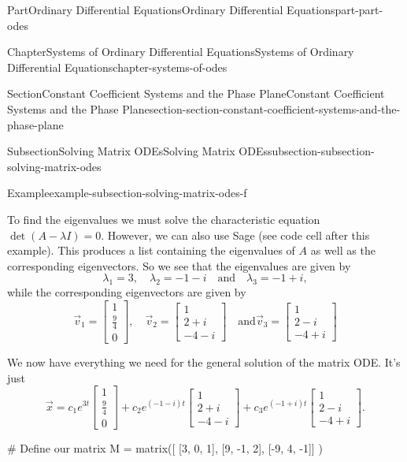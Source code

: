 \documentclass[twoside,10pt,]{book}
\numberwithin{equation}{part}
\begin{document}
\begin{partptx}{Part}{Ordinary Differential Equations}{}{Ordinary Differential Equations}{}{}{part-part-odes}
\begin{chapterptx}{Chapter}{Systems of Ordinary Differential Equations}{}{Systems of Ordinary Differential Equations}{}{}{chapter-systems-of-odes}
\begin{sectionptx}{Section}{Constant Coefficient Systems and the Phase Plane}{}{Constant Coefficient Systems and the Phase Plane}{}{}{section-section-constant-coefficient-systems-and-the-phase-plane}
\begin{subsectionptx}{Subsection}{Solving Matrix ODEs}{}{Solving Matrix ODEs}{}{}{subsection-subsection-solving-matrix-odes}
\begin{example}{Example}{}{example-subsection-solving-matrix-odes-f}
\begin{equation*}
\end{equation*}
%
\par
To find the eigenvalues we must solve the characteristic equation \(\det(A-\lambda I)=0\). However, we can also use Sage (see code cell after this example). This produces a list containing the eigenvalues of \(A\) as well as the corresponding eigenvectors. So we see that the eigenvalues are given by%
\begin{equation*}
\lambda_{1} = 3, \quad\lambda_{2} = -1 - i\quad\text{and}\quad\lambda_{3} = -1 + i,
\end{equation*}
while the corresponding eigenvectors are given by%
\begin{equation*}
\vec{v}_{1} = \begin{bmatrix}1 \\ \frac{9}{4} \\ 0\end{bmatrix}, \quad\vec{v}_{2} = \begin{bmatrix} 1 \\ 2 + i \\ -4 - i \end{bmatrix}\quad\text{and}\vec{v}_{3} = \begin{bmatrix} 1 \\ 2 - i \\ -4 + i \end{bmatrix}
\end{equation*}
%
\par
We now have everything we need for the general solution of the matrix ODE. It's just%
\begin{equation*}
\vec{x} = c_{1}e^{3t}\begin{bmatrix}1 \\ \frac{9}{4} \\ 0\end{bmatrix} + c_{2}e^{(-1 - i)t}\begin{bmatrix} 1 \\ 2 + i \\ -4 - i \end{bmatrix} + c_{3}e^{(-1 + i)t}\begin{bmatrix} 1 \\ 2 - i \\ -4 + i \end{bmatrix}.
\end{equation*}
%
\end{example}
\begin{sageinput}
# Define our matrix
M = matrix([ [3, 0, 1],
[9, -1, 2],
[-9, 4, -1]] )


\end{sageinput}
\end{subsectionptx}
\end{sectionptx}
\end{chapterptx}
\end{partptx}
\end{document}
